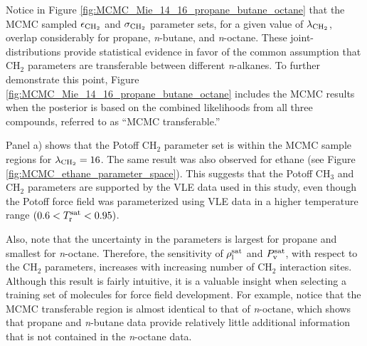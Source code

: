 \documentclass[preprint,letterpaper,floatfix,citeautoscript,aip,jcp]{revtex4-1}
\begin{document}

Notice in Figure \ref{fig:MCMC_Mie_14_16_propane_butane_octane} that the MCMC sampled $\epsilon_{\rm CH_2}$ and $\sigma_{\rm CH_2}$ parameter sets, for a given value of $\lambda_{\rm CH_2}$, overlap considerably for propane, \textit{n}-butane, and \textit{n}-octane. These joint-distributions provide statistical evidence in favor of the common assumption that CH$_2$ parameters are transferable between different \textit{n}-alkanes. To further demonstrate this point, Figure \ref{fig:MCMC_Mie_14_16_propane_butane_octane} includes the MCMC results when the posterior is based on the combined likelihoods from all three compounds, referred to as ``MCMC transferable.''

Panel a) shows that the Potoff CH$_2$ parameter set is within the MCMC sample regions for $\lambda_{\rm CH_2} = 16$. The same result was also observed for ethane (see Figure \ref{fig:MCMC_ethane_parameter_space}). This suggests that the Potoff CH$_3$ and CH$_2$ parameters are supported by the VLE data used in this study, even though the Potoff force field was parameterized using VLE data in a higher temperature range $(0.6 < T_{\rm r}^{\rm sat} < 0.95)$. 

Also, note that the uncertainty in the parameters is largest for propane and smallest for \textit{n}-octane. Therefore, the sensitivity of $\rho_{\rm l}^{\rm sat}$ and $P_{\rm v}^{\rm sat}$, with respect to the CH$_2$ parameters, increases with increasing number of CH$_2$ interaction sites. Although this result is fairly intuitive, it is a valuable insight when selecting a training set of molecules for force field development. For example, notice that the MCMC transferable region is almost identical to that of \textit{n}-octane, which shows that propane and \textit{n}-butane data provide relatively little additional information that is not contained in the \textit{n}-octane data. 
\end{document}
